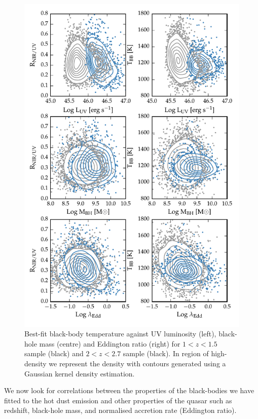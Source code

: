 \begin{figure}
  \centering
  \includegraphics[width=\textwidth]{figures/chapter05/correlations_contour.pdf}
  \caption{Best-fit black-body temperature against UV luminosity (left), black-hole mass (centre) and Eddington ratio (right) for $1 < z < 1.5$ sample (black) and $2 < z < 2.7$ sample (black). In region of high-density we represent the density with contours generated using a Gaussian kernel density estimation. }
  \label{fig:correlations_contour}
\end{figure}

We now look for correlations between the properties of the black-bodies we have fitted to the hot dust emission and other properties of the quasar such as redshift, black-hole mass, and normalised accretion rate (Eddington ratio). 

